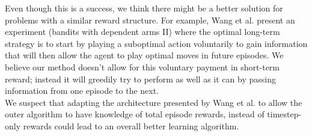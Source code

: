 
Even though this is a success, we think there might be a better solution for
problems with a similar reward structure. For example, Wang et al.
\cite{learningtorl} present an experiment (bandits with dependent arms II) 
where the optimal long-term strategy is to start by playing a suboptimal action
voluntarily to gain information that will then allow the agent to play
optimal moves in future episodes. We believe our method doesn't allow for 
this voluntary payment in short-term reward; instead it will greedily try
to perform as well as it can by passing information from one episode to the
next.\\

We suspect that adapting the architecture presented by Wang et al. to allow
the outer algorithm to have knowledge of total episode rewards, instead of
timestep-only rewards could lead to an overall better learning algorithm.


